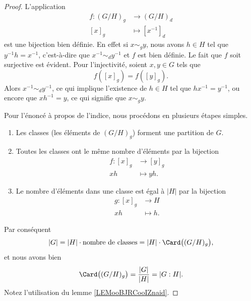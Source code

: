\begin{proof}
	L'application
	\begin{equation}
		\begin{aligned}
			f\colon (G/H)_g & \to (G/H)_d        \\
			[x]_g           & \mapsto [x^{-1}]_d
		\end{aligned}
	\end{equation}
	est une bijection bien définie. En effet si \( x\sim_g y\), nous avons \( h\in H\) tel que \( y^{-1}h=x^{-1}\), c'est-à-dire que \( x^{-1}\sim_d y^{-1}\) et \( f\) est bien définie. Le fait que \( f\) soit surjective est évident. Pour l'injectivité, soient \( x, y \in G \) tels que
	\begin{equation}
		f([x]_g)=f([y]_g).
	\end{equation}
	Alors \( x^{-1}\sim_d y^{-1}\), ce qui implique l'existence de \( h\in H\) tel que \( hx^{-1}=y^{-1}\), ou encore que \( xh^{-1}=y\), ce qui signifie que \( x\sim_gy\).

	Pour l'énoncé à propos de l'indice, nous procédons en plusieurs étapes simples.
	\begin{enumerate}
		\item
		      Les classes (les éléments de \( (G/H)_g\)) forment une partition de \( G\).
		\item
		      Toutes les classes ont le même nombre d'éléments par la bijection
		      \begin{equation}
			      \begin{aligned}
				      f\colon [x]_g & \to [y]_g   \\
				      xh            & \mapsto yh.
			      \end{aligned}
		      \end{equation}
		\item
		      Le nombre d'éléments dans une classe est égal à \( | H |\) par la bijection
		      \begin{equation}
			      \begin{aligned}
				      g\colon [x]_g & \to H      \\
				      xh            & \mapsto h.
			      \end{aligned}
		      \end{equation}
	\end{enumerate}
	Par conséquent
	\begin{equation}
		| G |=| H |\cdot \text{nombre de classes}=| H | \cdot \Card\big(  (G/H)_g \big),
	\end{equation}
	et nous avons bien
	\begin{equation}
		\Card\big( (G/H)_g \big)   =\frac{ | G | }{ | H | }=| G:H |.
	\end{equation}
	Notez l'utilisation du lemme \ref{LEMooBJRCooIZnaid}.
\end{proof}


